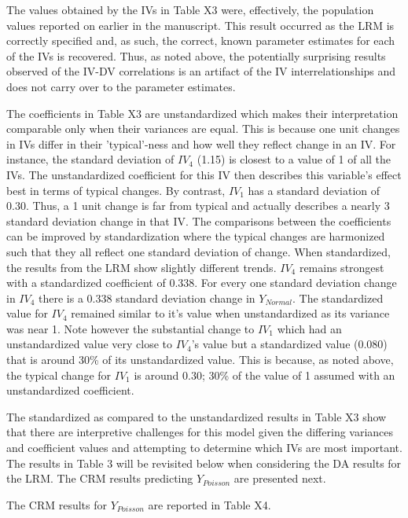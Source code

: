 \documentclass[ShortAfour,times,sageapa]{sagej}
\begin{document}
	
	The values obtained by the IVs in Table X3 were, effectively, the population values reported on earlier in the manuscript. 
	This result occurred as the LRM is correctly specified and, as such, the correct, known parameter estimates for each of the IVs is recovered.
	Thus, as noted above, the potentially surprising results observed of the IV-DV correlations is an artifact of the IV interrelationships and does not carry over to the parameter estimates.
	
	The coefficients in Table X3 are unstandardized which makes their interpretation comparable only when their variances are equal.
	This is because one unit changes in IVs differ in their 'typical'-ness and how well they reflect change in an IV.
	For instance, the standard deviation of $IV_4$ (1.15) is closest to a value of 1 of all the IVs.  
	The unstandardized coefficient for this IV then describes this variable's effect best in terms of typical changes.
	By contrast, $IV_1$ has a standard deviation of 0.30.
	Thus, a 1 unit change is far from typical and actually describes a nearly 3 standard deviation change in that IV.
	The comparisons between the coefficients can be improved by standardization where the typical changes are harmonized such that they all reflect one standard deviation of change.
	When standardized, the results from the LRM show slightly different trends.
	$IV_4$ remains strongest with a standardized coefficient of 0.338.
	For every one standard deviation change in $IV_4$ there is a 0.338 standard deviation change in $Y_{Normal}$.  
	The standardized value for $IV_4$ remained similar to it's value when unstandardized as its variance was near 1.
	Note however the substantial change to $IV_1$ which had an unstandardized value very close to $IV_4$'s value but a standardized value (0.080) that is around 30\% of its unstandardized value.
	This is because, as noted above, the typical change for $IV_1$ is around 0.30; 30\% of the value of 1 assumed with an unstandardized coefficient.
	
	The standardized as compared to the unstandardized results in Table X3 show that there are interpretive challenges for this model given the differing variances and coefficient values and attempting to determine which IVs are most important.  
	The results in Table 3 will be revisited below when considering the DA results for the LRM. 
	The CRM results predicting $Y_{Poisson}$ are presented next.
	
	The CRM results for $Y_{Poisson}$ are reported in Table X4.
	
\end{document}
